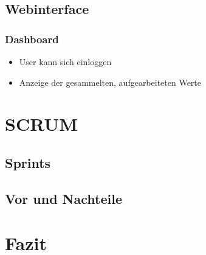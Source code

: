 \documentclass[11pt]{beamer}
\begin{document}
\subsection{Webinterface}
\begin{frame}
\frametitle{Dashboard}
	\begin{itemize}
	\item User kann sich einloggen
	\item Anzeige der gesammelten, aufgearbeiteten Werte
\end{itemize}
\end{frame}


\section{SCRUM}

\subsection{Sprints}

\subsection{Vor und Nachteile}


\section{Fazit}
\end{document}

